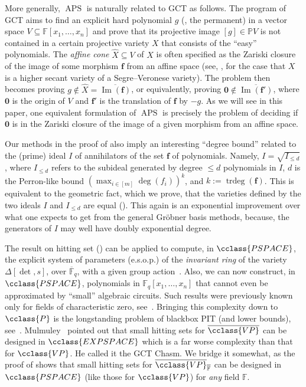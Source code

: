 \documentclass{toc}
\newcommand{\F}{\mathbb{F}}
\newcommand{\proj}{\mathbb{P}}
\DeclareMathOperator{\im}{\mathrm{Im}}
\DeclareMathOperator{\trdeg}{\mathrm{trdeg}}
\newcommand{\ol}[1]{\overline{#1}}
\newcommand{\Pclass}{\cclass{P}\xspace}  %
\newcommand{\PSPACE}{\cclass{PSPACE}\xspace}  %
\newcommand{\EXPSPACE}{\cclass{EXPSPACE}\xspace} %
\newcommand{\VP}{\cclass{VP}\xspace}  %
\newcommand{\VPbar}{\overline{\VP}\xspace}  %
\DeclareMathOperator{\APS}{\mathrm{APS}\xspace} %
\begin{document}
More generally, $\APS$ is naturally related to GCT as
%
follows. The   %
program of GCT aims to find an explicit hard polynomial $g$ (\eg, the permanent) in a vector space $V\subseteq\mathbb{F}[x_1,\dots,x_n]$ and prove that its projective image $[g]\in\proj V$ is not contained in a certain projective variety $X$ that consists of  the ``easy'' polynomials.
The \emph{affine cone} $\hat{X}\subseteq V$ of $X$ is often specified as the Zariski closure of the image of some morphism $\mathbf{f}$  from an affine space (see, \eg, \cite[Section~2]{Rai12} for the case that $X$ is a higher secant variety of a Segre--Veronese variety). The problem then becomes proving $g\not\in \hat{X}=\overline{\im(\mathbf{f})}$, or equivalently, proving $\mathbf{0}\not\in \overline{\im(\mathbf{f}')}$, where $\mathbf{0}$ is the origin of $V$ and $\mathbf{f}'$ is the translation of $\mathbf{f}$ by $-g$. As we will see in this paper, one equivalent formulation of $\APS$ is precisely the problem of deciding if $\mathbf{0}$ is in the Zariski closure of the image of a given morphism from an affine space. 


Our methods in the proof of  also imply an interesting ``degree bound'' related to the (prime) ideal $I$ of annihilators of
%
the set $\mathbf f$ of polynomials.  %
Namely, $I=\sqrt{I_{\le d}}$, where $I_{\le d}$ refers to the subideal generated by degree $\le d$ polynomials
%
in    %
$I$, $d$ is the Perron-like bound $(\max_{i\in [m]}\deg(f_i))^k$, and $k:= \trdeg(\mathbf f)$. This is equivalent to the geometric fact, which we prove, that the varieties defined by the two ideals $I$ and $I_{\le d}$ are equal (). This again is an exponential improvement over what one expects to get from the general Gr\"obner basis
methods, %
because, the generators of $I$ may well have
%
doubly exponential   %
degree.

The result on hitting set () can be applied to compute, in $\PSPACE$, the explicit system of parameters (e.s.o.p.) of the \emph{invariant ring} of the variety $\Delta[\det,s]$, over $\ol{\F}_q$, with a given group action~\cite[Theorem~4.9]{mulmuley2017geometric}. Also, we can now construct, in $\PSPACE$, polynomials in $\F_q[x_1,\dots,x_n]$ that cannot even be approximated by ``small'' algebraic circuits. Such results were previously known only for
%
fields of characteristic zero,  %
see~\cite[Theorems~1.1--1.4]{forbes2017pspace}. Bringing this complexity down to 
%
$\Pclass$  %
is the longstanding problem of blackbox PIT
%
(and lower bounds),  %
see~\cite{Saxena09, shpilka2010arithmetic, Saxena14}. Mulmuley~\cite{mul12} pointed out that small hitting sets for 
%
$\VPbar$ %
can be designed in
%
$\EXPSPACE$
which is a far worse complexity than that for 
%
$\VP$. %
He called it the GCT Chasm. We bridge it somewhat, as the proof of  shows that small hitting sets for 
%
$\VPbar_{\ol{\F}}$ %
can be designed in $\PSPACE$ (like those for 
%
$\VP$) %
for \emph{any} field $\F$.
\end{document}
